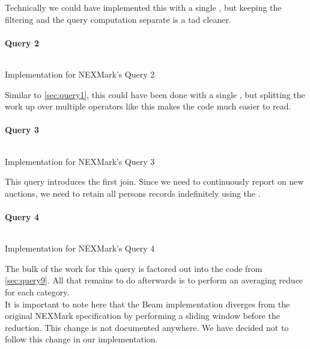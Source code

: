 Technically we could have implemented this with a single , but keeping the filtering and the query computation separate is a tad cleaner.

\paragraph{Query 2}
\begin{listing}[H]
  \inputminted[firstline=508,lastline=511]{rust}{benchmarks/src/nexmark.rs}
  \caption{Implementation for NEXMark's Query 2}
  \label{lst:nexmark-query2}
\end{listing}

Similar to \autoref{sec:query1}, this could have been done with a single , but splitting the work up over multiple operators like this makes the code much easier to read.

\paragraph{Query 3}
\begin{listing}[H]
  \inputminted[firstline=542,lastline=551]{rust}{benchmarks/src/nexmark.rs}
  \caption{Implementation for NEXMark's Query 3}
  \label{lst:nexmark-query3}
\end{listing}

This query introduces the first join. Since we need to continuously report on new auctions, we need to retain all persons records indefinitely using the .

\paragraph{Query 4}\label{sec:query4}
\begin{listing}[H]
  \inputminted[firstline=582,lastline=583]{rust}{benchmarks/src/nexmark.rs}
  \caption{Implementation for NEXMark's Query 4}
  \label{lst:nexmark-query4}
\end{listing}

The bulk of the work for this query is factored out into the code from \autoref{sec:query9}. All that remains to do afterwards is to perform an averaging reduce for each category. \\

It is important to note here that the Beam implementation diverges from the original NEXMark specification by performing a sliding window before the reduction. This change is not documented anywhere. We have decided not to follow this change in our implementation.


